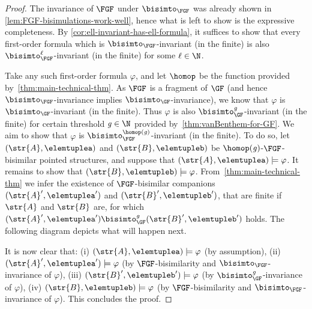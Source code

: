 \begin{proof}
  The invariance of $\FGF$ under $\bisimto_{\FGF}$ was already shown in \cref{lem:FGF-bisimulations-work-well}, hence what is left to show is the expressive completeness.
By \cref{cor:ell-invariant-has-ell-formula}, it suffices to show that every first-order formula which is $\bisimto_{\FGF}$-invariant (in the finite) is also $\bisimto_{\FGF}^{\ell}$-invariant (in the finite) for some $\ell \in \N$.

Take any such first-order formula $\varphi$, and let $\homop$ be the function provided by~\cref{thm:main-technical-thm}.
As $\FGF$ is a fragment of $\GF$ (and hence $\bisimto_{\FGF}$-invariance implies $\bisimto_{\GF}$-invariance), we know that $\varphi$ is $\bisimto_{\GF}$-invariant (in the finite).
Thus $\varphi$ is also $\bisimto_{\GF}^{\mathit{g}}$-invariant (in the finite) for certain threshold $\mathit{g} \in \N$ provided by~\cref{thm:vanBenthem-for-GF}.
We aim to show that $\varphi$ is $\bisimto_{\FGF}^{\homop(\mathit{g})}$-invariant (in the finite).
To do so, let $(\str{A}, \elemtuplea)$ and $(\str{B}, \elemtupleb)$ be $\homop(\mathit{g})$-$\FGF$-bisimilar pointed structures, and suppose that $(\str{A}, \elemtuplea) \models \varphi$. It remains to show that $(\str{B}, \elemtupleb) \models \varphi$.
From~\cref{thm:main-technical-thm} we infer the existence of $\FGF$-bisimilar companions $(\str{A}', \elemtuplea')$ and $(\str{B}', \elemtupleb')$, that are finite if $\str{A}$ and $\str{B}$ are, for which $(\str{A}', \elemtuplea') \bisimto^{\mathit{g}}_{\GF} (\str{B}', \elemtupleb')$ holds.
The following diagram depicts what will happen next.
\begin{figure}[H]
  \centering
  \usebox{\diagupgrading}
\end{figure}

It is now clear that:
(i) $(\str{A}, \elemtuplea) \models \varphi$ (by assumption),
(ii) $(\str{A}', \elemtuplea') \models \varphi$ (by $\FGF$-bisimilarity and $\bisimto_{\FGF}$-invariance of $\varphi$),
(iii) $(\str{B}', \elemtupleb') \models \varphi$ (by $\bisimto_{\GF}^{\mathit{g}}$-invariance of $\varphi$),
(iv) $(\str{B}, \elemtupleb) \models \varphi$ (by $\FGF$-bisimilarity and $\bisimto_{\FGF}$-invariance of $\varphi$).
This concludes the proof.
\end{proof}
\fi
